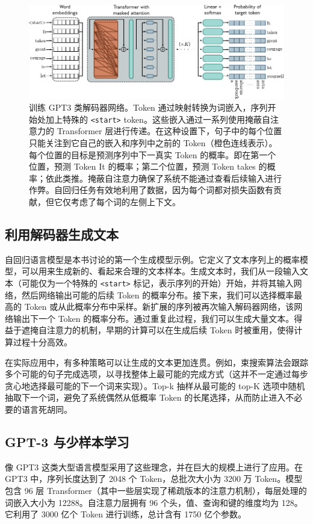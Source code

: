\documentclass[lang=cn,newtx,10pt,scheme=chinese]{elegantbook}
\begin{document}
\begin{figure}[ht!]
\centering
\includegraphics[width=0.7\linewidth]{PDFFigures/UDLChap12PDF/TransformerDecoder.pdf}
\caption{训练 GPT3 类解码器网络。Token 通过映射转换为词嵌入，序列开始处加上特殊的 \texttt{\textless start\textgreater} token。这些嵌入通过一系列使用掩蔽自注意力的 Transformer 层进行传递。在这种设置下，句子中的每个位置只能关注到它自己的嵌入和序列中之前的 Token（橙色连线表示）。每个位置的目标是预测序列中下一真实 Token 的概率。即在第一个位置，预测 Token It 的概率；第二个位置，预测 Token takes 的概率；依此类推。掩蔽自注意力确保了系统不能通过查看后续输入进行作弊。自回归任务有效地利用了数据，因为每个词都对损失函数有贡献，但它仅考虑了每个词的左侧上下文。}
\end{figure}

\subsection{利用解码器生成文本}
自回归语言模型是本书讨论的第一个生成模型示例。它定义了文本序列上的概率模型，可以用来生成新的、看起来合理的文本样本。生成文本时，我们从一段输入文本（可能仅为一个特殊的 \texttt{\textless start\textgreater} 标记，表示序列的开始）开始，并将其输入网络，然后网络输出可能的后续 Token 的概率分布。接下来，我们可以选择概率最高的 Token 或从此概率分布中采样。新扩展的序列被再次输入解码器网络，该网络输出下一个 Token 的概率分布。通过重复此过程，我们可以生成大量文本。得益于遮掩自注意力的机制，早期的计算可以在生成后续 Token 时被重用，使得计算过程十分高效。

在实际应用中，有多种策略可以让生成的文本更加连贯。例如，束搜索算法会跟踪多个可能的句子完成选项，以寻找整体上最可能的完成方式（这并不一定通过每步贪心地选择最可能的下一个词来实现）。Top-k 抽样从最可能的 top-K 选项中随机抽取下一个词，避免了系统偶然从低概率 Token 的长尾选择，从而防止进入不必要的语言死胡同。

\subsection{GPT-3 与少样本学习}
像 GPT3 这类大型语言模型采用了这些理念，并在巨大的规模上进行了应用。在 GPT3 中，序列长度达到了 2048 个 Token，总批次大小为 3200 万 Token。模型包含 96 层 Transformer（其中一些层实现了稀疏版本的注意力机制），每层处理的词嵌入大小为 12288。自注意力层拥有 96 个头，值、查询和键的维度均为 128。它利用了 3000 亿个 Token 进行训练，总计含有 1750 亿个参数。
\end{document}
